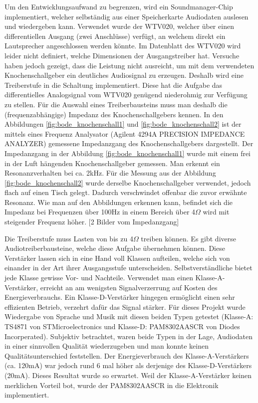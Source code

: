   Um den Entwicklungsaufwand zu begrenzen, wird ein Soundmanager-Chip implementiert, welcher selbständig aus einer Speicherkarte Audiodaten auslesen und wiedergeben kann. Verwendet wurde der WTV020, welcher über einen differentiellen Ausgang (zwei Anschlüsse) verfügt, an welchem direkt ein Lautsprecher angeschlossen werden könnte. 
  Im Datenblatt des WTV020 wird leider nicht definiert, welche Dimensionen der Ausgangstreiber hat. 
  Versuche haben jedoch gezeigt, dass die Leistung nicht ausreicht, um mit dem verwendeten Knochenschallgeber ein deutliches Audiosignal zu erzeugen. 
  Deshalb wird eine Treiberstufe in die Schaltung implementiert. 
  Diese hat die Aufgabe das differentielles Analogsignal vom WTV020 genügend niederohmig zur Verfügung zu stellen. 
  Für die Auswahl eines Treiberbausteins muss man deshalb die (frequenzabhängige) Impedanz des Knochenschallgebers kennen. 
  In den Abbildungen \ref{fig:bode_knochenschall1} und \ref{fig:bode_knochenschall2} ist der mittels eines Frequenz Analysator (Agilent 4294A PRECISION IMPEDANCE ANALYZER) gemessene Impedanzgang des Knochenschallgebers dargestellt. 
  Der Impedanzgang in der Abbildung \ref{fig:bode_knochenschall1} wurde mit einem frei in der Luft hängenden Knochenschallgeber gemessen. Man erkennt ein Resonanzverhalten bei ca. 2kHz. 
  Für die Messung aus der Abbildung \ref{fig:bode_knochenschall2} wurde derselbe Knochenschallgeber verwendet, jedoch flach auf einen Tisch gelegt. 
  Dadurch verschwindet offenbar die zuvor erwähnte Resonanz. 
  Wie man auf den Abbildungen erkennen kann, befindet sich die Impedanz bei Frequenzen über 100Hz in einem Bereich über 4\(\Omega\) wird mit steigender Frequenz höher. 
  [2 Bilder vom Impedanzgang]
  
  Die Treiberstufe muss Lasten von bis zu 4\(\Omega\) treiben können. 
  Es gibt diverse Audiotreiberbausteine, welche diese Aufgabe übernehmen können. 
  Diese Verstärker lassen sich in eine Hand voll Klassen aufteilen, welche sich von einander in der Art ihrer Ausgangsstufe unterscheiden. 
  Selbstverständliche bietet jede Klasse gewisse Vor- und Nachteile. 
  Verwendet man einen Klasse-A-Verstärker, erreicht an am wenigsten Signalverzerrung auf Kosten des Energieverbrauchs. 
  Ein Klasse-D-Verstärker hingegen ermöglicht einen sehr effizienten Betrieb, verzehrt dafür das Signal stärker. 
  Für dieses Projekt wurde Wiedergabe von Sprache und Musik mit diesen beiden Typen getestet (Klasse-A: TS4871 von STMicroelectronics und Klasse-D: PAM8302AASCR von Diodes Incorperated). 
  Subjektiv betrachtet, waren beide Typen in der Lage, Audiodaten in einer sinnvollen Qualität wiederzugeben und man konnte keinen Qualitätsunterschied feststellen. Der Energieverbrauch des Klasse-A-Verstärkers (ca. 120mA) war jedoch rund 6 mal höher als derjenige des Klasse-D-Verstärkers (20mA).
  Dieses Resultat wurde so erwartet. Weil der Klasse-A-Verstärker keinen merklichen Vorteil bot, wurde der PAM8302AASCR in die Elektronik implementiert.
 
